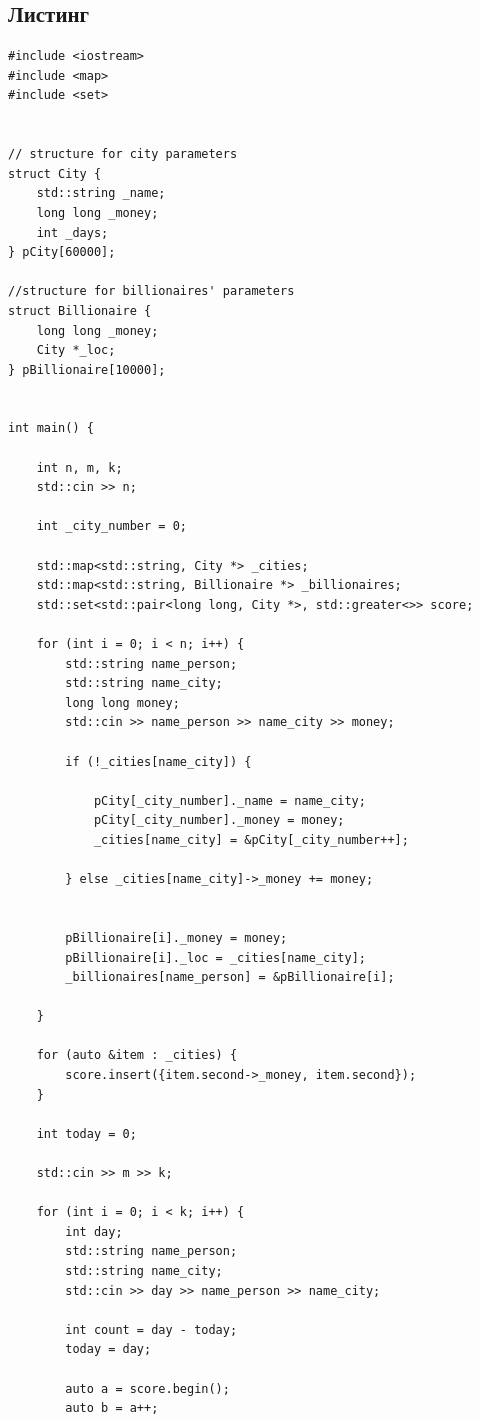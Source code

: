 \documentclass[a5paper, 10pt]{article}
\theoremstyle{definition}
\theoremstyle{plain}
\theoremstyle{remark}
\begin{document}
\subsection{Листинг}

\begin{center}
\begin{lstlisting}[label=some-code,caption={Исходный код для 1650}]
#include <iostream>
#include <map>
#include <set>


// structure for city parameters
struct City {
    std::string _name;
    long long _money;
    int _days;
} pCity[60000];

//structure for billionaires' parameters
struct Billionaire {
    long long _money;
    City *_loc;
} pBillionaire[10000];


int main() {

    int n, m, k;
    std::cin >> n;

    int _city_number = 0;

    std::map<std::string, City *> _cities;
    std::map<std::string, Billionaire *> _billionaires;
    std::set<std::pair<long long, City *>, std::greater<>> score;

    for (int i = 0; i < n; i++) {
        std::string name_person;
        std::string name_city;
        long long money;
        std::cin >> name_person >> name_city >> money;

        if (!_cities[name_city]) {

            pCity[_city_number]._name = name_city;
            pCity[_city_number]._money = money;
            _cities[name_city] = &pCity[_city_number++];

        } else _cities[name_city]->_money += money;


        pBillionaire[i]._money = money;
        pBillionaire[i]._loc = _cities[name_city];
        _billionaires[name_person] = &pBillionaire[i];

    }

    for (auto &item : _cities) {
        score.insert({item.second->_money, item.second});
    }

    int today = 0;

    std::cin >> m >> k;

    for (int i = 0; i < k; i++) {
        int day;
        std::string name_person;
        std::string name_city;
        std::cin >> day >> name_person >> name_city;

        int count = day - today;
        today = day;

        auto a = score.begin();
        auto b = a++;


\end{lstlisting}
\end{center}
\end{document}
